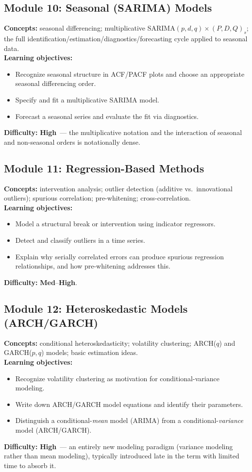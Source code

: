 \documentclass[11pt]{article}
\newcommand{\High}{\textcolor{diffHigh}{\textbf{High}}}
\newcommand{\MedHigh}{\textcolor{diffMed}{\textbf{Med}}--\textcolor{diffHigh}{\textbf{High}}}
\newcommand{\module}[2]{\subsection*{Module #1: #2}}
\begin{document}
\module{10}{Seasonal (SARIMA) Models}
\textbf{Concepts:} seasonal differencing; multiplicative SARIMA$(p,d,q)\times(P,D,Q)_s$; the full
identification/estimation/diagnostics/forecasting cycle applied to seasonal data.\\
\textbf{Learning objectives:}
\begin{itemize}
  \item Recognize seasonal structure in ACF/PACF plots and choose an appropriate seasonal
        differencing order.
  \item Specify and fit a multiplicative SARIMA model.
  \item Forecast a seasonal series and evaluate the fit via diagnostics.
\end{itemize}
\textbf{Difficulty:} \High\ --- the multiplicative notation and the interaction of seasonal and
non-seasonal orders is notationally dense.

\module{11}{Regression-Based Methods}
\textbf{Concepts:} intervention analysis; outlier detection (additive vs.\ innovational outliers);
spurious correlation; pre-whitening; cross-correlation.\\
\textbf{Learning objectives:}
\begin{itemize}
  \item Model a structural break or intervention using indicator regressors.
  \item Detect and classify outliers in a time series.
  \item Explain why serially correlated errors can produce spurious regression relationships, and how
        pre-whitening addresses this.
\end{itemize}
\textbf{Difficulty:} \MedHigh.

\module{12}{Heteroskedastic Models (ARCH/GARCH)}
\textbf{Concepts:} conditional heteroskedasticity; volatility clustering; ARCH($q$) and GARCH($p,q$)
models; basic estimation ideas.\\
\textbf{Learning objectives:}
\begin{itemize}
  \item Recognize volatility clustering as motivation for conditional-variance modeling.
  \item Write down ARCH/GARCH model equations and identify their parameters.
  \item Distinguish a conditional-\emph{mean} model (ARIMA) from a conditional-\emph{variance} model
        (ARCH/GARCH).
\end{itemize}
\textbf{Difficulty:} \High\ --- an entirely new modeling paradigm (variance modeling rather than mean
modeling), typically introduced late in the term with limited time to absorb it.
\end{document}
